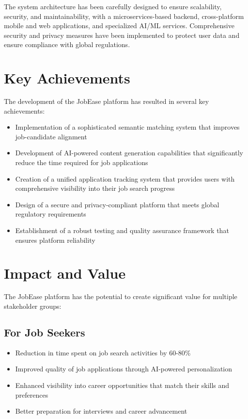 \documentclass[12pt,a4paper]{report}
\begin{document}
The system architecture has been carefully designed to ensure scalability, security, and maintainability, with a microservices-based backend, cross-platform mobile and web applications, and specialized AI/ML services. Comprehensive security and privacy measures have been implemented to protect user data and ensure compliance with global regulations.

\section{Key Achievements}
The development of the JobEase platform has resulted in several key achievements:

\begin{itemize}[leftmargin=2em]
  \item Implementation of a sophisticated semantic matching system that improves job-candidate alignment
  \item Development of AI-powered content generation capabilities that significantly reduce the time required for job applications
  \item Creation of a unified application tracking system that provides users with comprehensive visibility into their job search progress
  \item Design of a secure and privacy-compliant platform that meets global regulatory requirements
  \item Establishment of a robust testing and quality assurance framework that ensures platform reliability
\end{itemize}

\section{Impact and Value}
The JobEase platform has the potential to create significant value for multiple stakeholder groups:

\subsection{For Job Seekers}
\begin{itemize}[leftmargin=2em]
  \item Reduction in time spent on job search activities by 60-80\%
  \item Improved quality of job applications through AI-powered personalization
  \item Enhanced visibility into career opportunities that match their skills and preferences
  \item Better preparation for interviews and career advancement
\end{itemize}
\end{document}
